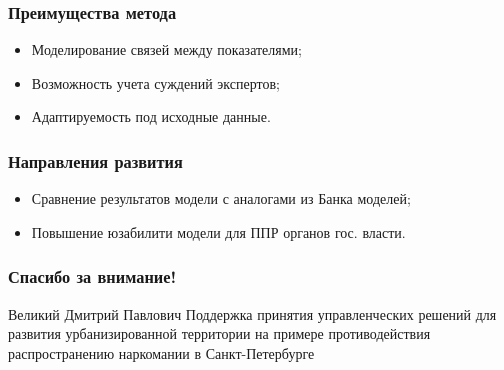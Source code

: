 \documentclass[t]{beamer}  %
\begin{document}
\begin{frame}
    \frametitle{Преимущества метода}
    \begin{itemize}
        \item Моделирование связей между показателями;
        \item Возможность учета суждений экспертов;
        \item Адаптируемость под исходные данные.
    \end{itemize}

\end{frame}
\begin{frame}
    \frametitle{Направления развития}
    \begin{itemize}
        \item Сравнение результатов модели с аналогами из Банка моделей;
        \item Повышение юзабилити модели для ППР органов гос. власти.
    \end{itemize}
\end{frame}
\begin{frame}
    \frametitle{Спасибо за внимание!}
    \begin{block}{Великий Дмитрий Павлович}
        Поддержка принятия управленческих решений для развития урбанизированной
        территории на примере противодействия распространению наркомании в
        Санкт-Петербурге
    \end{block}
\end{frame}
\end{document}
